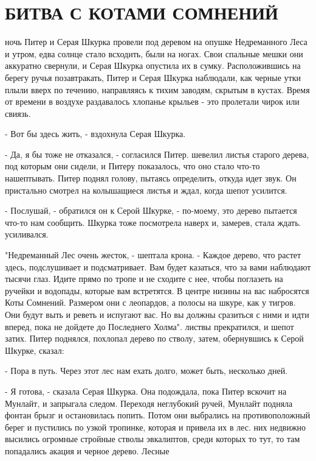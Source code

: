 \chapter{БИТВА С КОТАМИ СОМНЕНИЙ}
\par{} ночь Питер и Серая Шкурка провели под деревом на опушке 
Недреманного Леса и утром, едва солнце стало всходить, были на ногах. 
Свои спальные мешки они аккуратно свернули, и Серая Шкурка опустила их 
в сумку. Расположившись на берегу ручья позавтракать, Питер и Серая 
Шкурка наблюдали, как черные утки плыли вверх по течению, направляясь 
к тихим заводям, скрытым в кустах. Время от времени в воздухе 
раздавалось хлопанье крыльев - это пролетали чирок или свиязь.
\par- Вот бы здесь жить, - вздохнула Серая Шкурка.
\par- Да, я бы тоже не отказался, - согласился Питер.
 шевелил листья старого дерева, под которым они сидели, и 
Питеру показалось, что оно стало что-то нашептывать. Питер поднял 
голову, пытаясь определить, откуда идет звук. Он пристально смотрел на 
колышащиеся листья и ждал, когда шепот усилится.
\par- Послушай, - обратился он к Серой Шкурке, - по-моему, это дерево 
пытается что-то нам сообщить.
 Шкурка тоже посмотрела наверх и, замерев, стала ждать.
 усиливался.
\par"Недреманный Лес очень жесток, - шептала крона. - Каждое дерево, 
что растет здесь, подслушивает и подсматривает. Вам будет казаться, 
что за вами наблюдают тысячи глаз. Идите прямо по тропе и не сходите с 
нее, чтобы поглазеть на ручейки и водопады, которые вам встретятся. В 
центре низины на вас набросятся Коты Сомнений. Размером они с 
леопардов, а полосы на шкуре, как у тигров. Они будут выть и реветь и 
испугают вас. Но вы должны сразиться с ними и идти вперед, пока не 
дойдете до Последнего Холма".
 листвы прекратился, и шепот затих. Питер поднялся, похлопал 
дерево по стволу, затем, обернувшись к Серой Шкурке, сказал:
\par- Пора в путь. Через этот лес нам ехать долго, может быть, 
несколько дней.
\par- Я готова, - сказала Серая Шкурка. Она подождала, пока Питер 
вскочит на Мунлайт, и запрыгала следом. Переходя неглубокий ручей, 
Мунлайт подняла фонтан брызг и остановилась попить. Потом они 
выбрались на противоположный берег и пустились по узкой тропинке, 
которая и привела их в лес.
 них недвижно высились огромные стройные стволы эвкалиптов, 
среди которых то тут, то там попадались акация и черное дерево. Лесные 
